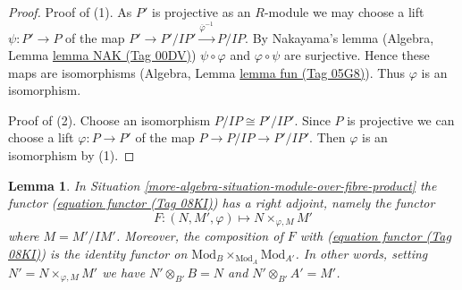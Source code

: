 \documentclass{amsart}
\theoremstyle{plain}
\newtheorem{lemma}[subsection]{Lemma}
\theoremstyle{definition}
\theoremstyle{remark}
\numberwithin{equation}{subsection}
\begin{document}
\begin{proof}
Proof of (1). As $P'$ is projective as an $R$-module we may
choose a lift $\psi : P' \to P$ of the map
$P' \to P'/IP' \xrightarrow{\overline{\varphi}^{-1}} P/IP$.
By Nakayama's lemma (Algebra, Lemma \href{https://stacks.math.columbia.edu/tag/00DV}{lemma NAK (Tag 00DV)})
$\psi \circ \varphi$ and $\varphi \circ \psi$ are surjective.
Hence these maps are isomorphisms (Algebra, Lemma \href{https://stacks.math.columbia.edu/tag/05G8}{lemma fun (Tag 05G8)}).
Thus $\varphi$ is an isomorphism.

\medskip\noindent
Proof of (2). Choose an isomorphism $P/IP \cong P'/IP'$.
Since $P$ is projective we can choose a lift $\varphi : P \to P'$ of the map
$P \to P/IP \to P'/IP'$. Then $\varphi$ is an isomorphism by (1).
\end{proof}


\begin{lemma}
\label{more-algebra-lemma-module-over-fibre-product}
In Situation \ref{more-algebra-situation-module-over-fibre-product}
the functor (\href{https://stacks.math.columbia.edu/tag/08KI}{equation functor (Tag 08KI)}) has a right adjoint, namely
the functor
$$
F : (N, M', \varphi) \longmapsto N \times_{\varphi, M} M'
$$
where $M = M'/IM'$. Moreover, the composition of $F$ with
(\href{https://stacks.math.columbia.edu/tag/08KI}{equation functor (Tag 08KI)}) is the identity functor on
$\text{Mod}_B \times_{\text{Mod}_A} \text{Mod}_{A'}$. In other words,
setting $N' = N \times_{\varphi, M} M'$ we have
$N' \otimes_{B'} B = N$ and $N' \otimes_{B'} A' = M'$.
\end{lemma}
\end{document}
